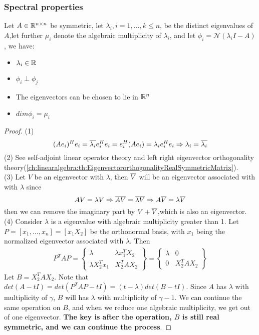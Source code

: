 \begin{refsection}
\subsubsection{Spectral properties}
\begin{theorem}
\cite{calafiore2014optimization}\label{ch:linearalgebra:th:symmetricmatrixspectraldecomposition} Let $A\in \mathbb{R}^{n\times n}$ be symmetric, let $\lambda_i,i=1,...,k \leq n$, be the distinct eigenvalues of $A$,let further $\mu_i$ denote the algebraic multiplicity of $\lambda_i$, and let $\phi_i = \mathcal{N}(\lambda_i I - A)$, we have:
\begin{itemize}
    \item $\lambda_i \in \mathbb{R}$
    \item $\phi_i \perp \phi_j$
    \item The eigenvectors can be chosen to lie in $\mathbb{R}^n$
    \item $dim\phi_i = \mu_i$
\end{itemize}
\end{theorem}
\begin{proof}
(1) $$(Ae_i)^H e_i = \overline{\lambda_i} e_i^H e_i = e_i^H(Ae_i) = \lambda_i e_i^H e_i \Rightarrow \lambda_i = \overline{\lambda_i}$$ 
(2) See self-adjoint linear operator theory and left right eigenvector orthogonality theory(\autoref{ch:linearalgebra:th:EigenvectororthogonalityRealSymmetricMatrix}).\\
(3) Let $V$ be an eigenvector with $\lambda$, then $\overline{V}$ will be an eigenvector associated with with $\lambda$ since $$AV=\lambda V\Rightarrow \overline{AV} =  \overline{\lambda V} \Rightarrow A\overline{V} =  \lambda\overline{V}$$
then we can remove the imaginary part by $V+\overline{V}$,which is also an eigenvector.
(4) Consider $\lambda$ is a eigenvalue with algebraic multiplicity greater than 1. Let $P = [x_1,...,x_n] = [x_1 X_2]$ be the orthonormal basis, with $x_1$ being the normalized eigenvector associated with $\lambda$.
Then 
\begin{align*}
	P^TAP = \begin{Bmatrix}
	\lambda & \lambda x_1^TX_2\\
	\lambda X_2^Tx_1 & X_2^TAX_2
	\end{Bmatrix} = \begin{Bmatrix}
	\lambda & 0\\
	0 & X_2^TAX_2
	\end{Bmatrix}
\end{align*}
Let $B=X_2^TAX_2$. Note that $det(A-tI) = det(P^TAP-tI) = (t-\lambda)det(B-tI)$. Since $A$ has $\lambda$ with multiplicity of $\gamma$, $B$ will has $\lambda$ with multiplicity of $\gamma - 1$. 
We can continue the same operation on $B$, and when we reduce one algebraic multiplicity, we get out of one eigenvector. \textbf{The key is after the operation, $B$ is still real symmetric, and we can continue the process}.
\end{proof}





\end{refsection}
